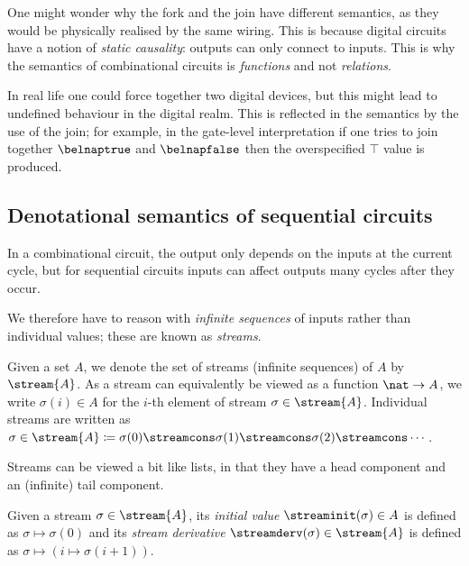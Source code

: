 \documentclass{lmcs}
\begin{document}
\begin{rem}
    One might wonder why the fork and the join have different semantics, as they
    would be physically realised by the same wiring.
    This is because digital circuits have a notion of \emph{static causality}:
    outputs can only connect to inputs.
    This is why the semantics of combinational circuits is \emph{functions} and
    not \emph{relations}.

    In real life one could force together two digital devices, but this might
    lead to undefined behaviour in the digital realm.
    This is reflected in the semantics by the use of the join; for example, in
    the gate-level interpretation if one tries to join together \(\belnaptrue\) and
    \(\belnapfalse\) then the overspecified \(\top\) value is produced.
\end{rem}

\subsection{Denotational semantics of sequential circuits}

In a combinational circuit, the output only depends on the inputs at the current
cycle, but for sequential circuits inputs can affect outputs many cycles after
they occur.

We therefore have to reason with \emph{infinite sequences} of inputs rather than
individual values; these are known as \emph{streams}.

\begin{nota}
    Given a set \(A\), we denote the set of streams (infinite sequences) of
    \(A\) by \(\stream{A}\).
    As a stream can equivalently be viewed as a function \(\nat \to A\), we
    write \(\sigma(i) \in A\) for the \(i\)-th element of stream
    \(\sigma \in \stream{A}\).
    Individual streams are written as \(
    \sigma \in \stream{A}
    \coloneqq
    \sigma(0) \streamcons \sigma(1) \streamcons
    \sigma(2) \streamcons \cdots
    \).
\end{nota}

Streams can be viewed a bit like lists, in that they have a head component and
an (infinite) tail component.

\begin{defi}\label{def:stream-operations}
    Given a stream \(\sigma \in \stream{A}\), its \emph{initial value}
    \(\streaminit(\sigma) \in A\) is defined as \(\sigma \mapsto \sigma(0)\)
    and its \emph{stream derivative} \(\streamderv(\sigma) \in \stream{A}\) is
    defined as \(\sigma \mapsto (i \mapsto \sigma(i+1))\).
\end{defi}
\end{document}
